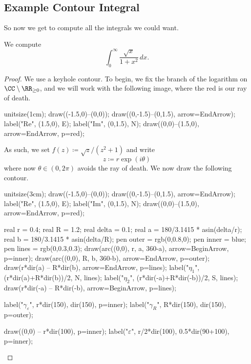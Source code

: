 \subsection{Example Contour Integral}
So now we get to compute all the integrals we could want.
\begin{exe}
	We compute
	\[\int_0^\infty\frac{\sqrt x}{1+x^2}\,dx.\]
\end{exe}
\begin{proof}
	We use a keyhole contour. To begin, we fix the branch of the logarithm on $\CC\setminus\RR_{\ge0}$, and we will work with the following image, where the red is our ray of death.
	\begin{center}
		\begin{asy}
			unitsize(1cm);
			draw((-1.5,0)--(0,0));
			draw((0,-1.5)--(0,1.5), arrow=EndArrow);
			label("$\textrm{Re}$", (1.5,0), E);
			label("$\textrm{Im}$", (0,1.5), N);
			draw((0,0)--(1.5,0), arrow=EndArrow, p=red);
		\end{asy}
	\end{center}
	As such, we set $f(z)\coloneqq \sqrt z/\left(z^2+1\right)$ and write
	\[z\coloneqq r\exp(i\theta)\]
	where now $\theta\in(0,2\pi)$ avoids the ray of death. We now draw the following contour.
	\begin{center}
		\begin{asy}
			unitsize(3cm);
			draw((-1.5,0)--(0,0));
			draw((0,-1.5)--(0,1.5), arrow=EndArrow);
			label("$\textrm{Re}$", (1.5,0), E);
			label("$\textrm{Im}$", (0,1.5), N);
			draw((0,0)--(1.5,0), arrow=EndArrow, p=red);

			real r = 0.4;
			real R = 1.2;
			real delta = 0.1;
			real a = 180/3.1415 * asin(delta/r);
			real b = 180/3.1415 * asin(delta/R);
			pen outer = rgb(0,0.8,0);
			pen inner = blue;
			pen lines = rgb(0,0.3,0.3);
			draw(arc((0,0), r, a, 360-a), arrow=BeginArrow, p=inner);
			draw(arc((0,0), R, b, 360-b), arrow=EndArrow, p=outer);
			draw(r*dir(a) -- R*dir(b), arrow=EndArrow, p=lines);
			label("$\eta_1$", (r*dir(a)+R*dir(b))/2, N, lines);
			label("$\eta_2$", (r*dir(-a)+R*dir(-b))/2, S, lines);
			draw(r*dir(-a) -- R*dir(-b), arrow=BeginArrow, p=lines);

			label("$\gamma_\varepsilon$", r*dir(150), dir(150), p=inner);
			label("$\gamma_R$", R*dir(150), dir(150), p=outer);

			draw((0,0) -- r*dir(100), p=inner);
			label("$\varepsilon$", r/2*dir(100), 0.5*dir(90+100), p=inner);


\end{asy}
\end{center}
\end{proof}
